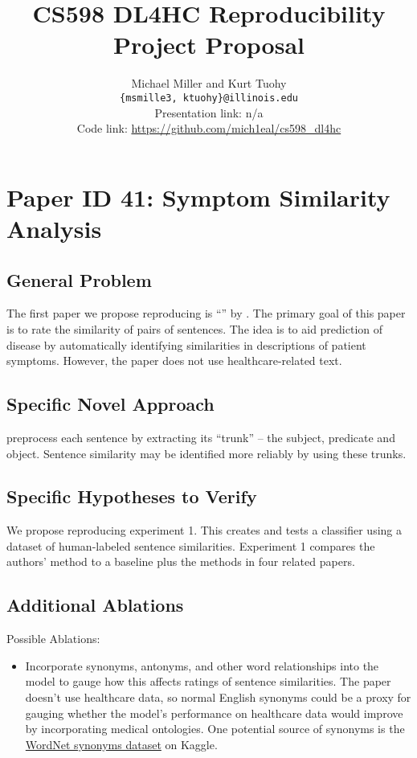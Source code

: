 \documentclass[11pt,a4paper]{article}
\title{CS598 DL4HC Reproducibility Project Proposal}
\author{Michael Miller and Kurt Tuohy \\
  \texttt{\{msmille3, ktuohy\}@illinois.edu}
  \\[2em]
  Presentation link: n/a\url{} \\
  Code link: \url{https://github.com/mich1eal/cs598_dl4hc}}
\begin{document}
\maketitle


\section{Paper ID 41: Symptom Similarity Analysis}
\subsection{General Problem}
The first paper we propose reproducing is ``'' by \citeauthor*{zhang_2019}. The primary goal of this paper is to rate the similarity of pairs of sentences. The idea is to aid prediction of disease by automatically identifying similarities in descriptions of patient symptoms. However, the paper does not use healthcare-related text.

\subsection{Specific Novel Approach}
\citet{zhang_2019} preprocess each sentence by extracting its ``trunk'' -- the subject, predicate and object. Sentence similarity may be identified more reliably by using these trunks.

\subsection{Specific Hypotheses to Verify}
We propose reproducing experiment 1. This creates and tests a classifier using a dataset of human-labeled sentence similarities. Experiment 1 compares the authors' method to a baseline plus the methods in four related papers.

\subsection{Additional Ablations}
Possible Ablations:
\begin{itemize}
  \item Incorporate synonyms, antonyms, and other word relationships into the model to gauge how this affects ratings of sentence similarities. The paper doesn't use healthcare data, so normal English synonyms could be a proxy for gauging whether the model's performance on healthcare data would improve by incorporating medical ontologies. One potential source of synonyms is the \href{https://www.kaggle.com/datasets/duketemon/wordnet-synonyms}{WordNet synonyms dataset} on Kaggle.
\end{itemize}
\end{document}
